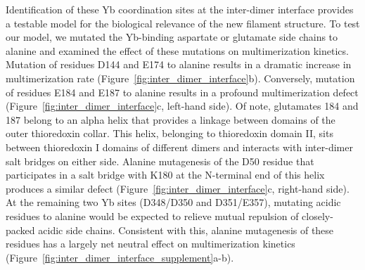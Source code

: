 Identification of these Yb coordination sites at the inter-dimer interface provides a testable model for the biological relevance of the new filament structure. To test our model, we mutated the Yb-binding aspartate or glutamate side chains to alanine and examined the effect of these mutations on multimerization kinetics. Mutation of residues D144 and E174 to alanine results in a dramatic increase in multimerization rate (Figure~\ref{fig:inter_dimer_interface}b). Conversely, mutation of residues E184 and E187 to alanine results in a profound multimerization defect (Figure~\ref{fig:inter_dimer_interface}c, left-hand side). Of note, glutamates 184 and 187 belong to an alpha helix that provides a linkage between domains of the outer thioredoxin collar. This helix, belonging to thioredoxin domain II, sits between thioredoxin I domains of different dimers and interacts with inter-dimer salt bridges on either side. Alanine mutagenesis of the D50 residue that participates in a salt bridge with K180 at the N-terminal end of this helix produces a similar defect (Figure~\ref{fig:inter_dimer_interface}c, right-hand side). At the remaining two Yb sites (D348/D350 and D351/E357), mutating acidic residues to alanine would be expected to relieve mutual repulsion of closely-packed acidic side chains. Consistent with this, alanine mutagenesis of these residues has a largely net neutral effect on multimerization kinetics (Figure~\ref{fig:inter_dimer_interface_supplement}a-b). 
